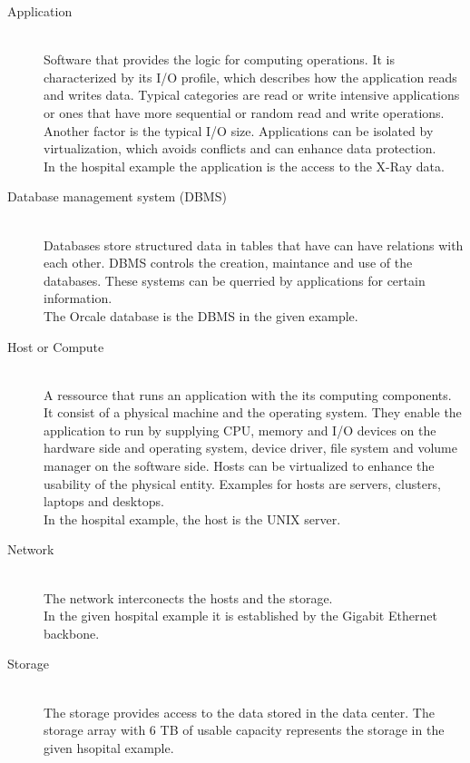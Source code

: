 \documentclass{article}
\begin{document}
	\begin{description}
		\item[Application] \hfill \\
			Software that provides the logic for computing operations.
			It is characterized by its I/O profile,
			which describes how the application reads and writes data.
			Typical categories are read or write intensive applications
			or ones that have more sequential or random read and write operations.
			Another factor is the typical I/O size.
			Applications can be isolated by virtualization,
			which avoids conflicts and can enhance data protection.\\
			In the hospital example the application is the access to the X-Ray data.

		\item[Database management system (DBMS)] \hfill \\
			Databases store structured data in tables that have can have relations with each other.
			DBMS controls the creation, maintance and use of the databases.
			These systems can be querried by applications for certain information.\\
			The Orcale database is the DBMS in the given example.
			
		\item[Host or Compute] \hfill \\
			A ressource that runs an application with the its computing components.
			It consist of a physical machine and the operating system.
			They enable the application to run by supplying CPU, memory and I/O devices on the hardware side
			and operating system, device driver, file system and volume manager on the software side.
			Hosts can be virtualized to enhance the usability of the physical entity.
			Examples for hosts are servers, clusters, laptops and desktops.\\
			In the hospital example, the host is the UNIX server.

		\item[Network] \hfill \\
			The network interconects the hosts and the storage.\\
			In the given hospital example it is established by the Gigabit Ethernet backbone.

		\item[Storage] \hfill \\
			The storage provides access to the data stored in the data center.
			The storage array with 6 TB of usable capacity represents the storage in the given hsopital example.

	\end{description}
\end{document}
